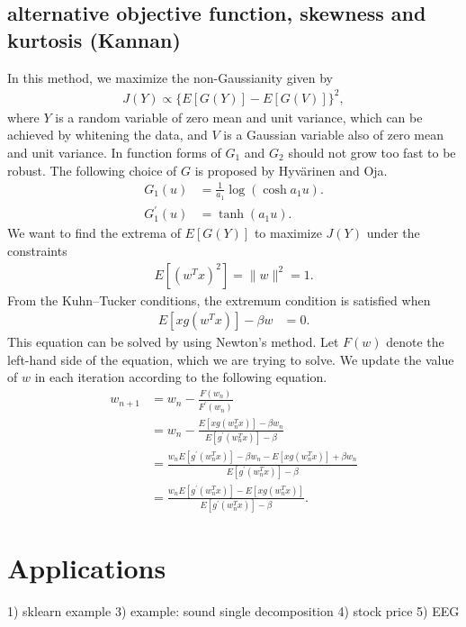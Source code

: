 \documentclass[aps,prl,preprint,superscriptaddress]{revtex4-2}
\begin{document}
\subsection{alternative objective function, skewness and kurtosis (Kannan)}
In this method, we maximize the non-Gaussianity given by
\begin{align}
J(Y) \propto \{E[G(Y)] - E[G(V)]\}^2,
\end{align}
where $Y$ is a random variable of zero mean and unit variance, which can be achieved by whitening the data, and $V$ is a Gaussian variable also of zero mean and unit variance. In function forms of $G_1$ and $G_2$ should not grow too fast to be robust. The following choice of $G$ is proposed by Hyvärinen and Oja.
\begin{align}
G_1(u) &= \frac{1}{a_1} \log (\cosh a_1 u). \\
G_1^{\prime}(u) &= \tanh(a_1 u).
\end{align}
We want to find the extrema of $E[G(Y)]$ to maximize $J(Y)$ under the constraints
\begin{align}
E[(w^T x)^2] = \| w\|^2 = 1.
\end{align}
From the Kuhn--Tucker conditions, the extremum condition is satisfied when
\begin{align}
E[x g(w^Tx)] - \beta w &= 0.
\end{align}
This equation can be solved by using Newton's method.
Let $F(w)$ denote the left-hand side of the equation, which we are trying to solve.
We update the value of $w$ in each iteration according to the following equation.
\begin{align}
w_{n+1} &= w_n - \frac{F(w_n)}{F^{\prime}(w_n)} \\
&= w_n - \frac{E[x g (w_n^T x)] - \beta w_n}{E[g^{\prime}(w_n^T x)] - \beta} \\
&= \frac{w_n E[g^{\prime}(w_n^T x)] - \beta w_n - E[x g (w_n^T x)] + \beta w_n}{E[g^{\prime}(w_n^T x)] - \beta} \\
&= \frac{w_n E[g^{\prime}(w_n^T x)] - E[x g (w_n^T x)]}{E[g^{\prime}(w_n^T x)] - \beta}.
\end{align}

\section{Applications}
1) sklearn example
3) example: sound single decomposition
4) stock price
5) EEG
\end{document}
